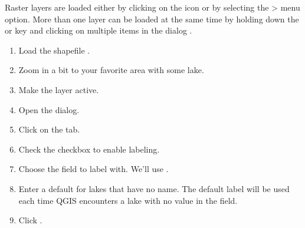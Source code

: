
Raster layers are loaded either by clicking on the 
 icon or by selecting the > 
menu option. More than one layer can be loaded at the same time by holding 
down the  or  key and clicking on 
multiple items in the dialog .



\begin{enumerate} 
\item Load the shapefile .
\item Zoom in a bit to your favorite area with some lake.
\item Make the  layer active.
\item Open the  dialog.
\item Click on the  tab.
\item Check the  checkbox to enable labeling.
\item Choose the field to label with. We'll use .
\item Enter a default for lakes that have no name. The default label will be
  used each time QGIS encounters a lake with no value in the  field.
\item Click .
\end{enumerate} 



